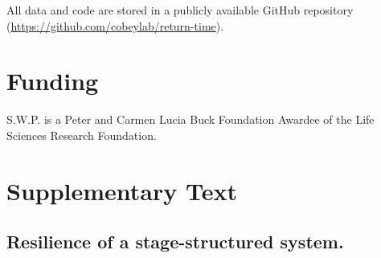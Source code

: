 \documentclass[12pt]{article}
\begin{document}
All data and code are stored in a publicly available GitHub repository (\url{https://github.com/cobeylab/return-time}).

\section*{Funding}

S.W.P. is a Peter and Carmen Lucia Buck Foundation Awardee of the Life Sciences Research Foundation. 

\pagebreak

\setcounter{figure}{0}
\setcounter{equation}{0}
\renewcommand{\thefigure}{S\arabic{figure}}
\renewcommand{\theequation}{S\arabic{equation}}

\section*{Supplementary Text}

\subsection*{Resilience of a stage-structured system.}
\end{document}
